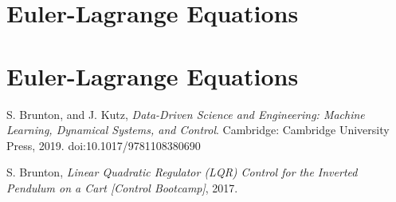 \documentclass[a4 paper]{article}
\begin{document}
\section{Euler-Lagrange Equations}


\newpage
\section{Euler-Lagrange Equations}




\newpage
\begin{thebibliography}{9}

    S. Brunton, and J. Kutz,
    \textit{Data-Driven Science and Engineering: Machine Learning, Dynamical Systems, and Control}.
    Cambridge: Cambridge University Press, 2019.
    doi:10.1017/9781108380690
    
    S. Brunton,
    \textit{Linear Quadratic Regulator (LQR) Control for the Inverted Pendulum on a Cart [Control Bootcamp]}, 2017.
    
\end{thebibliography}
\end{document}
